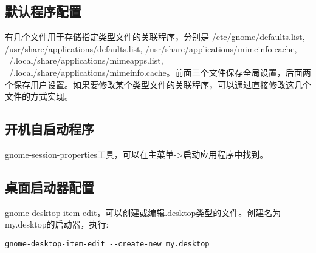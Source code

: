 \subsection{默认程序配置}
有几个文件用于存储指定类型文件的关联程序，分别是 /etc/gnome/defaults.list, /usr/share/applications/defaults.list, /usr/share/applications/mimeinfo.cache, ~/.local/share/applications/mimeapps.list, ~/.local/share/applications/mimeinfo.cache。前面三个文件保存全局设置，后面两个保存用户设置。如果要修改某个类型文件的关联程序，可以通过直接修改这几个文件的方式实现。

\subsection{开机自启动程序}
gnome-session-properties工具，可以在主菜单->启动应用程序中找到。

\subsection{桌面启动器配置}
gnome-desktop-item-edit，可以创建或编辑.desktop类型的文件。创建名为my.desktop的启动器，执行:
\begin{verbatim}
gnome-desktop-item-edit --create-new my.desktop
\end{verbatim}










